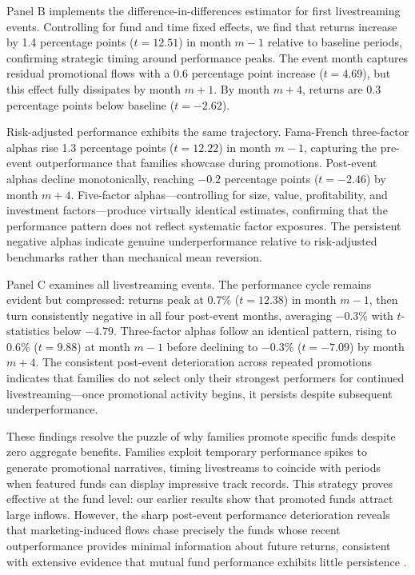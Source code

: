 \documentclass[12pt]{article}
\begin{document}
Panel B implements the difference-in-differences estimator for first livestreaming events. Controlling for fund and time fixed effects, we find that returns increase by 1.4 percentage points ($t = 12.51$) in month $m-1$ relative to baseline periods, confirming strategic timing around performance peaks. The event month captures residual promotional flows with a 0.6 percentage point increase ($t = 4.69$), but this effect fully dissipates by month $m+1$. By month $m+4$, returns are 0.3 percentage points below baseline ($t = -2.62$). 

Risk-adjusted performance exhibits the same trajectory. Fama-French three-factor alphas rise 1.3 percentage points ($t = 12.22$) in month $m-1$, capturing the pre-event outperformance that families showcase during promotions. Post-event alphas decline monotonically, reaching $-0.2$ percentage points ($t = -2.46$) by month $m+4$. Five-factor alphas—controlling for size, value, profitability, and investment factors—produce virtually identical estimates, confirming that the performance pattern does not reflect systematic factor exposures. The persistent negative alphas indicate genuine underperformance relative to risk-adjusted benchmarks rather than mechanical mean reversion.

Panel C examines all livestreaming events. The performance cycle remains evident but compressed: returns peak at 0.7\% ($t = 12.38$) in month $m-1$, then turn consistently negative in all four post-event months, averaging $-0.3\%$ with $t$-statistics below $-4.79$. Three-factor alphas follow an identical pattern, rising to 0.6\% ($t = 9.88$) at month $m-1$ before declining to $-0.3\%$ ($t = -7.09$) by month $m+4$. The consistent post-event deterioration across repeated promotions indicates that families do not select only their strongest performers for continued livestreaming—once promotional activity begins, it persists despite subsequent underperformance.

These findings resolve the puzzle of why families promote specific funds despite zero aggregate benefits. Families exploit temporary performance spikes to generate promotional narratives, timing livestreams to coincide with periods when featured funds can display impressive track records. This strategy proves effective at the fund level: our earlier results show that promoted funds attract large inflows. However, the sharp post-event performance deterioration reveals that marketing-induced flows chase precisely the funds whose recent outperformance provides minimal information about future returns, consistent with extensive evidence that mutual fund performance exhibits little persistence \citep{carhart1997persistence}.
\end{document}
